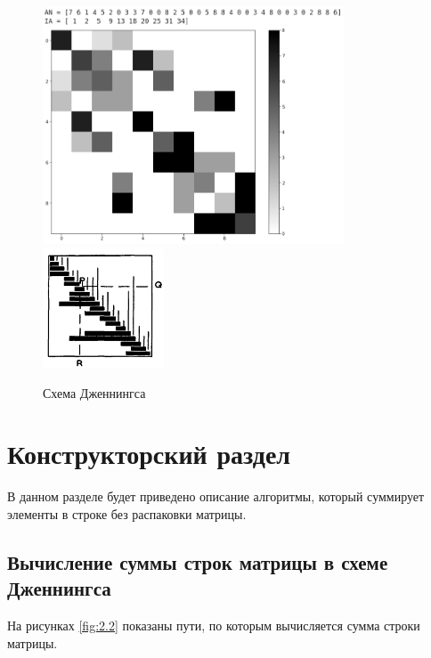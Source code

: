 \begin{figure}[h!]
    \centering
    \includegraphics[width=0.8\textwidth]{inc/p1.png}
    \includegraphics[width=0.32\textwidth]{inc/p2.png}
    \caption{Схема Дженнингса}
\end{figure}



\chapter{Конструкторский раздел}
\label{cha:design}

В данном разделе будет приведено описание алгоритмы,
который суммирует элементы в строке без распаковки матрицы.

\section{Вычисление суммы строк матрицы в схеме Дженнингса}

На рисунках \ref{fig:2.2} показаны пути, по которым вычисляется сумма строки матрицы.



